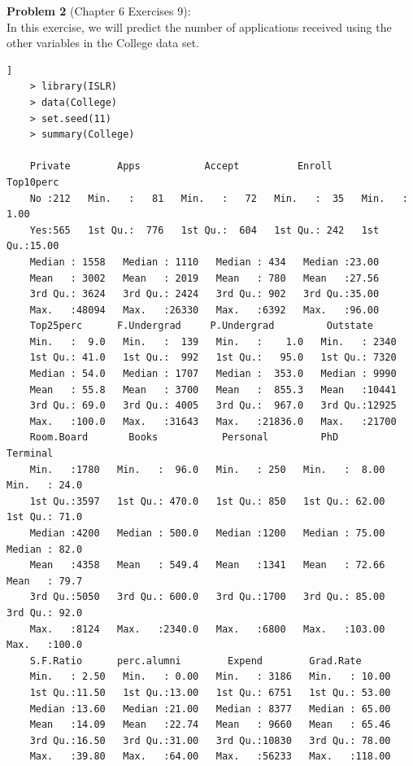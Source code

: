 \documentclass{article}
\begin{document}
\newpage

{\bf Problem 2} (Chapter 6 Exercises 9):\\

In this exercise, we will predict the number of applications received using the other variables in the College data set.\\

\begin{program}
	\begin{verbatim}]
	> library(ISLR)
	> data(College)
	> set.seed(11)
	> summary(College)
	
	Private        Apps           Accept          Enroll       Top10perc    
	No :212   Min.   :   81   Min.   :   72   Min.   :  35   Min.   : 1.00  
	Yes:565   1st Qu.:  776   1st Qu.:  604   1st Qu.: 242   1st Qu.:15.00  
	Median : 1558   Median : 1110   Median : 434   Median :23.00  
	Mean   : 3002   Mean   : 2019   Mean   : 780   Mean   :27.56  
	3rd Qu.: 3624   3rd Qu.: 2424   3rd Qu.: 902   3rd Qu.:35.00  
	Max.   :48094   Max.   :26330   Max.   :6392   Max.   :96.00  
	Top25perc      F.Undergrad     P.Undergrad         Outstate    
	Min.   :  9.0   Min.   :  139   Min.   :    1.0   Min.   : 2340  
	1st Qu.: 41.0   1st Qu.:  992   1st Qu.:   95.0   1st Qu.: 7320  
	Median : 54.0   Median : 1707   Median :  353.0   Median : 9990  
	Mean   : 55.8   Mean   : 3700   Mean   :  855.3   Mean   :10441  
	3rd Qu.: 69.0   3rd Qu.: 4005   3rd Qu.:  967.0   3rd Qu.:12925  
	Max.   :100.0   Max.   :31643   Max.   :21836.0   Max.   :21700  
	Room.Board       Books           Personal         PhD            Terminal    
	Min.   :1780   Min.   :  96.0   Min.   : 250   Min.   :  8.00   Min.   : 24.0  
	1st Qu.:3597   1st Qu.: 470.0   1st Qu.: 850   1st Qu.: 62.00   1st Qu.: 71.0  
	Median :4200   Median : 500.0   Median :1200   Median : 75.00   Median : 82.0  
	Mean   :4358   Mean   : 549.4   Mean   :1341   Mean   : 72.66   Mean   : 79.7  
	3rd Qu.:5050   3rd Qu.: 600.0   3rd Qu.:1700   3rd Qu.: 85.00   3rd Qu.: 92.0  
	Max.   :8124   Max.   :2340.0   Max.   :6800   Max.   :103.00   Max.   :100.0  
	S.F.Ratio      perc.alumni        Expend        Grad.Rate     
	Min.   : 2.50   Min.   : 0.00   Min.   : 3186   Min.   : 10.00  
	1st Qu.:11.50   1st Qu.:13.00   1st Qu.: 6751   1st Qu.: 53.00  
	Median :13.60   Median :21.00   Median : 8377   Median : 65.00  
	Mean   :14.09   Mean   :22.74   Mean   : 9660   Mean   : 65.46  
	3rd Qu.:16.50   3rd Qu.:31.00   3rd Qu.:10830   3rd Qu.: 78.00  
	Max.   :39.80   Max.   :64.00   Max.   :56233   Max.   :118.00  
	
	\end{verbatim}
\end{program}
\end{document}
